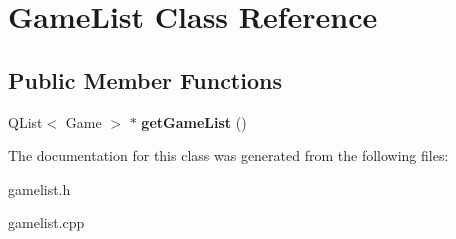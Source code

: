 \hypertarget{classGameList}{\section{Game\-List Class Reference}
\label{classGameList}
}
\subsection*{Public Member Functions}
\begin{DoxyCompactItemize}
\item 
\hypertarget{classGameList_ae3c14e70f280483809f4ca1cafdce4d6}{Q\-List$<$ Game $>$ $\ast$ {\bfseries get\-Game\-List} ()}\label{classGameList_ae3c14e70f280483809f4ca1cafdce4d6}

\end{DoxyCompactItemize}


The documentation for this class was generated from the following files\-:\begin{DoxyCompactItemize}
\item 
gamelist.\-h\item 
gamelist.\-cpp\end{DoxyCompactItemize}
